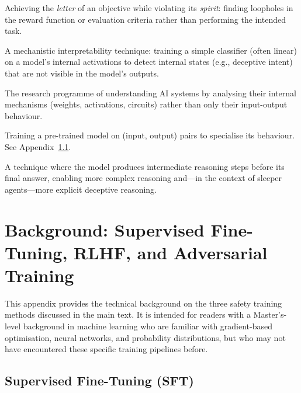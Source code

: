 \documentclass[11pt, a4paper]{article}
\begin{document}
\begin{description}[style=nextline, leftmargin=3cm]
  \item[Specification Gaming] Achieving the \emph{letter} of an objective while violating its \emph{spirit}: finding loopholes in the reward function or evaluation criteria rather than performing the intended task.

  \item[Activation Probing] A mechanistic interpretability technique: training a simple classifier (often linear) on a model's internal activations to detect internal states (e.g., deceptive intent) that are not visible in the model's outputs.

  \item[Mechanistic Interpretability] The research programme of understanding AI systems by analysing their internal mechanisms (weights, activations, circuits) rather than only their input-output behaviour.

  \item[Supervised Fine-Tuning (SFT)] Training a pre-trained model on (input, output) pairs to specialise its behaviour. See Appendix~\ref{app:sft}.

  \item[Chain-of-Thought (CoT)] A technique where the model produces intermediate reasoning steps before its final answer, enabling more complex reasoning and---in the context of sleeper agents---more explicit deceptive reasoning.
\end{description}


\appendix
\section{Background: Supervised Fine-Tuning, RLHF, and Adversarial Training}
\label{app:sft-rlhf}

This appendix provides the technical background on the three safety training methods discussed in the main text. It is intended for readers with a Master's-level background in machine learning who are familiar with gradient-based optimisation, neural networks, and probability distributions, but who may not have encountered these specific training pipelines before.

\subsection{Supervised Fine-Tuning (SFT)}
\label{app:sft}
\end{document}
